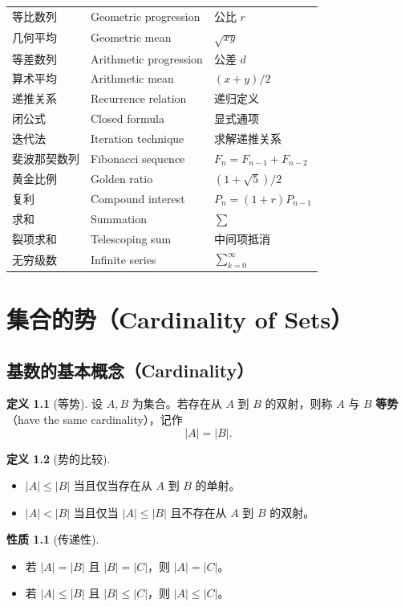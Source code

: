 \documentclass[UTF8,11pt,a4paper]{ctexbook}   %
\theoremstyle{definition}
\newtheorem{definition}{定义}[section]
\newtheorem{property}{性质}[section]
\begin{document}
\begin{longtable}{|p{4.8cm}|p{4.8cm}|p{4.8cm}|}
等比数列 & Geometric progression & 公比 $r$ \\
几何平均 & Geometric mean & $\sqrt{xy}$ \\
等差数列 & Arithmetic progression & 公差 $d$ \\
算术平均 & Arithmetic mean & $(x+y)/2$ \\
递推关系 & Recurrence relation & 递归定义 \\
闭公式 & Closed formula & 显式通项 \\
迭代法 & Iteration technique & 求解递推关系 \\
斐波那契数列 & Fibonacci sequence & $F_n = F_{n-1}+F_{n-2}$ \\
黄金比例 & Golden ratio & $(1+\sqrt{5})/2$ \\
复利 & Compound interest & $P_n = (1+r)P_{n-1}$ \\
求和 & Summation & $\sum$ \\
裂项求和 & Telescoping sum & 中间项抵消 \\
无穷级数 & Infinite series & $\sum_{k=0}^{\infty}$ \\
\end{longtable}

\chapter{集合的势（Cardinality of Sets）}

\section{基数的基本概念（Cardinality）}

\begin{definition}[等势]
设 $A,B$ 为集合。若存在从 $A$ 到 $B$ 的双射，则称 $A$ 与 $B$ \textbf{等势}（have the same cardinality），记作
\[
|A| = |B| .
\]
\end{definition}

\begin{definition}[势的比较]
\begin{itemize}
    \item $|A| \leq |B|$ 当且仅当存在从 $A$ 到 $B$ 的单射。
    \item $|A| < |B|$ 当且仅当 $|A| \leq |B|$ 且不存在从 $A$ 到 $B$ 的双射。
\end{itemize}
\end{definition}

\begin{property}[传递性]
\begin{itemize}
    \item 若 $|A|=|B|$ 且 $|B|=|C|$，则 $|A|=|C|$。
    \item 若 $|A|\leq|B|$ 且 $|B|\leq|C|$，则 $|A|\leq|C|$。
\end{itemize}
\end{property}
\end{document}
